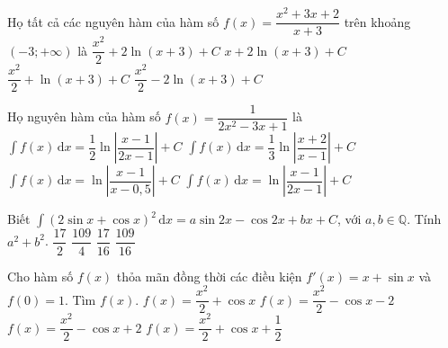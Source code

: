 \begin{ex}%
	Họ tất cả các nguyên hàm của hàm số $f(x)=\dfrac{x^2+3x+2}{x+3}$ trên khoảng $(-3;+\infty)$ là
	\choice
	{\True $\dfrac{x^2}{2}+2\ln(x+3)+C$}
	{$x+2\ln(x+3)+C$}
	{$\dfrac{x^2}{2}+\ln(x+3)+C$}
	{$\dfrac{x^2}{2}-2\ln(x+3)+C$}
\end{ex}
\begin{ex}%
	Họ nguyên hàm của hàm số $f(x) = \dfrac{1}{2x^2-3x+1}$ là
	\choice
	{$\displaystyle\int f(x) \mathrm{\,d}x =\dfrac{1}{2}\ln \left|\dfrac{x-1}{2x-1}\right|+C$}
	{$\displaystyle\int f(x) \mathrm{\,d}x =\dfrac{1}{3}\ln \left|\dfrac{x+2}{x-1}\right|+C$}
	{$\displaystyle\int f(x) \mathrm{\,d}x =\ln \left|\dfrac{x-1}{x-0,5}\right|+C$}
	{\True $\displaystyle\int f(x) \mathrm{\,d}x =\ln \left|\dfrac{x-1}{2x-1}\right|+C$}
\end{ex}
\begin{ex}%
	Biết $\displaystyle  \int(2\sin x + \cos x)^2\mathrm{\, d}x=a \sin 2x - \cos 2x + bx +C$, với $a,b \in \mathbb{Q}$. Tính $a^2+b^2$.
	\choice
	{$\dfrac{17}{2}$}
	{$\dfrac{109}{4}$}
	{$\dfrac{17}{16}$}
	{\True $\dfrac{109}{16}$}
	\end{ex}
\begin{ex}%
	Cho hàm số $f(x)$ thỏa mãn đồng thời các điều kiện $f'(x)=x+\sin x$ và $f(0)=1$. Tìm $f(x)$.
	\choice
	{$f(x)=\dfrac{x^2}{2}+\cos x$}
	{$f(x)=\dfrac{x^2}{2}-\cos x-2$}
	{\True $f(x)=\dfrac{x^2}{2}-\cos x+2$}
	{$f(x)=\dfrac{x^2}{2}+\cos x+\dfrac{1}{2}$}
\end{ex}


